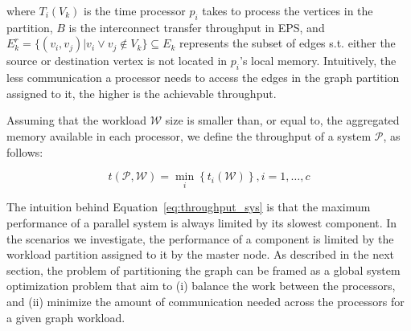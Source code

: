 where $T_i(V_k)$ is the time processor $p_i$ takes to process the vertices in the partition, $B$ is the interconnect transfer throughput in EPS, and $E_k^{r} = \{(v_i,v_j) | v_i \vee v_j \notin V_k\} \subseteq E_k$ represents the subset of edges s.t. either the source or destination vertex is not located in $p_i$'s local memory. Intuitively, the less communication a processor needs to access the edges in the graph partition assigned to it, the higher is the achievable throughput.

Assuming that the workload $\mathcal{W}$ size is smaller than, or equal to, the aggregated memory available in each processor, we define the throughput of a system $\mathcal{P}$, as follows: 

\begin{equation}
t(\mathcal{P}, \mathcal{W}) = \min_{i}\left\{t_i(\mathcal{W})\right\}, i = {1, \ldots, c}
\label{eq:throughput_sys}
\end{equation}

The intuition behind Equation~\ref{eq:throughput_sys} is that the maximum performance of a parallel system is always limited by its slowest component. In the scenarios we investigate, the performance of a component is limited by the workload partition assigned to it by the master node. As described in the next section, the problem of partitioning the graph can be framed as a global system optimization problem that aim to (i) balance the work between the processors, and (ii) minimize the amount of communication needed across the processors for a given graph workload.
